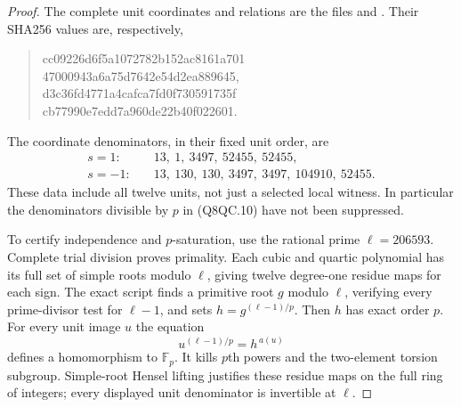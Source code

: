 \begin{proof}
The complete unit coordinates and relations are the files
 and
.
Their SHA256 values are, respectively,
\begin{quote}\ttfamily\small
cc09226d6f5a1072782b152ac8161a701\\
47000943a6a75d7642e54d2ea889645,\\
d3c36fd4771a4cafca7fd0f730591735f\\
cb77990e7edd7a960de22b40f022601.
\end{quote}
The coordinate denominators, in their fixed unit order, are
\[
 \begin{aligned}
 s=1:&\quad13,\ 1,\ 3497,\ 52455,\ 52455,\\
 s=-1:&\quad13,\ 130,\ 130,\ 3497,\ 3497,\ 104910,\ 52455.
 \end{aligned}
 \tag{Q8QC.10}
\]
These data include all twelve units, not just a selected local
witness.  In particular the denominators divisible by $p$ in
(Q8QC.10) have not been suppressed.

To certify independence and $p$-saturation, use the rational
prime $\ell=206593$.
Complete trial division proves primality.
Each cubic and quartic polynomial has its full set of simple
roots modulo $\ell$, giving twelve degree-one residue maps for
each sign.
The exact script finds a primitive root $g$ modulo $\ell$,
verifying every prime-divisor test for $\ell-1$, and sets
$h=g^{(\ell-1)/p}$.
Then $h$ has exact order $p$.
For every unit image $u$ the equation
\[
                u^{(\ell-1)/p}=h^{\,a(u)}
 \tag{Q8QC.11}
\]
defines a homomorphism to $\mathbb F_p$.
It kills $p$th powers and the two-element torsion subgroup.
Simple-root Hensel lifting justifies these residue maps on the
full ring of integers; every displayed unit denominator is
invertible at $\ell$.


\end{proof}
